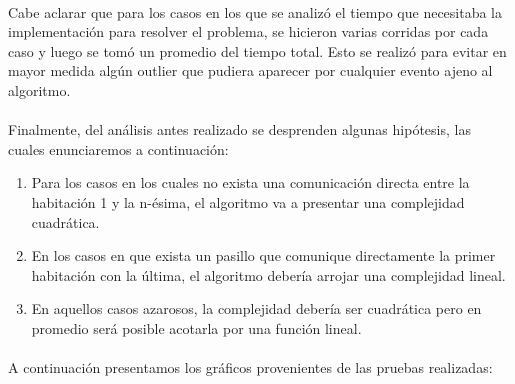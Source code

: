 \paragraph{}
Cabe aclarar que para los casos en los que se analizó el tiempo que necesitaba la implementación para resolver el problema, se hicieron varias corridas por cada caso y luego se tomó un promedio del tiempo total. Esto se realizó para evitar en mayor medida algún outlier que pudiera aparecer por cualquier evento ajeno al algoritmo.

\paragraph{}
Finalmente, del análisis antes realizado se desprenden algunas hipótesis, las cuales enunciaremos a continuación:
\begin{enumerate}
  \item Para los casos en los cuales no exista una comunicación directa entre la habitación 1 y la n-ésima, el algoritmo va a presentar una complejidad cuadrática.
  \item En los casos en que exista un pasillo que comunique directamente la primer habitación con la última, el algoritmo debería arrojar una complejidad lineal.
  \item En aquellos casos azarosos, la complejidad debería ser cuadrática pero en promedio será posible acotarla por una función lineal.
\end{enumerate}

\paragraph{}
A continuación presentamos los gráficos provenientes de las pruebas realizadas:

		
